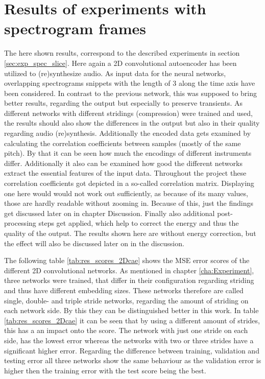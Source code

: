\section{Results of experiments with spectrogram frames}
The here shown results, correspond to the described experiments in section \ref{sec:exp_spec_slice}. Here again a 2D convolutional autoencoder has been utilized to (re)synthesize audio. As input data for the neural networks, overlapping spectrograms snippets with the length of 3 along the time axis have been considered. In contrast to the previous network, this was supposed to bring better results, regarding the output but especially to preserve transients. As different networks with different stridings (compression) were trained and used, the results should also show the differences in the output but also in their quality regarding audio (re)synthesis. Additionally the encoded data gets examined by calculating the correlation coefficients between samples (mostly of the same pitch). By that it can be seen how much the encodings of different instruments differ. Additionally it also can be examined how good the different networks extract the essential features of the input data. Throughout the project these correlation coefficients got depicted in a so-called correlation matrix. Displaying one here would would not work out sufficiently, as because of its many values, those are hardly readable without zooming in. Because of this, just the findings get discussed later on in chapter Discussion. Finally also additional post-processing steps get applied, which help to correct the energy and thus the quality of the output. The results shown here are without energy correction, but the effect will also be discussed later on in the discussion.

The following table \ref{tab:res_scores_2Dcae} shows the MSE error scores of the different 2D convolutional networks. As mentioned in chapter \ref{cha:Experiment}, three networks were trained, that differ in their configuration regarding striding and thus have different embedding sizes. These networks therefore are called single, double- and triple stride networks, regarding the amount of striding on each network side. By this they can be distinguished better in this work. In table \ref{tab:res_scores_2Dcae} it can be seen that by using a different amount of strides, this has a an impact onto the score. The network with just one stride on each side, has the lowest error whereas the networks with two or three strides have a significant higher error. Regarding the difference between training, validation and testing error all three networks show the same behaviour as the validation error is higher then the training error with the test score being the best. 

